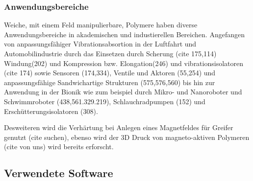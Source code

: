 \subsubsection{Anwendungsbereiche}
Weiche, mit einem Feld manipulierbare, Polymere haben diverse Anwendungsbereiche in akademischen und industierellen Bereichen. Angefangen von anpassungsfähiger Vibrationsabsortion in der Luftfahrt und Automobilindustrie durch das Einsetzen durch Scherung (cite 175,114) Windung(202) und Kompression bzw. Elongation(246) und vibrationsisolatoren (cite 174) sowie Sensoren (174,334), Ventile und Aktoren (55,254) und anpassungsfähige Sandwichartige Strukturen (575,576,560) bis hin zur Anwendung in der Bionik wie zum beispiel durch Mikro- und Nanoroboter und Schwimmroboter (438,561.329.219), Schlauchradpumpen (152) und Erschütterungsisolatoren (308).

Desweiteren wird die Verhärtung bei Anlegen eines Magnetfeldes für Greifer genutzt (cite suchen), ebenso wird der 3D Druck von magneto-aktiven Polymeren (cite von uns) wird bereits erforscht.

\subsection{Verwendete Software}
	
